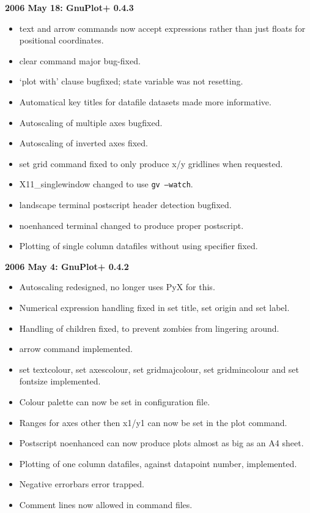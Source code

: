 \documentclass[a4paper,onecolumn,11pt]{book}
\begin{document}
\noindent \textbf{2006 May 18: GnuPlot+ 0.4.3}
\begin{itemize}
\item text and arrow commands now accept expressions rather than just floats for positional coordinates.
\item clear command major bug-fixed.
\item `plot with' clause bugfixed; state variable was not resetting.
\item Automatical key titles for datafile datasets made more informative.
\item Autoscaling of multiple axes bugfixed.
\item Autoscaling of inverted axes fixed.
\item set grid command fixed to only produce x/y gridlines when requested.
\item X11\_singlewindow changed to use \texttt{gv --watch}.
\item landscape terminal postscript header detection bugfixed.
\item noenhanced terminal changed to produce proper postscript.
\item Plotting of single column datafiles without using specifier fixed.
\end{itemize}

\noindent \textbf{2006 May 4: GnuPlot+ 0.4.2}
\begin{itemize}
\item Autoscaling redesigned, no longer uses PyX for this.
\item Numerical expression handling fixed in set title, set origin and set label.
\item Handling of children fixed, to prevent zombies from lingering around.
\item arrow command implemented.
\item set textcolour, set axescolour, set gridmajcolour, set gridmincolour and set fontsize implemented.
\item Colour palette can now be set in configuration file.
\item Ranges for axes other then x1/y1 can now be set in the plot command.
\item Postscript noenhanced can now produce plots almost as big as an A4 sheet.
\item Plotting of one column datafiles, against datapoint number, implemented.
\item Negative errorbars error trapped.
\item Comment lines now allowed in command files.
\end{itemize}
\end{document}
